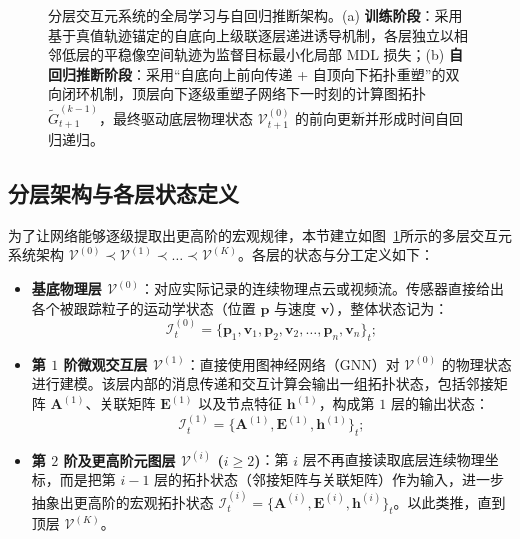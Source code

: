 \documentclass[11pt,a4paper]{article}
\numberwithin{equation}{section}
\theoremstyle{definition}
\theoremstyle{remark}
\begin{document}
\begin{figure}[htbp]
		\caption{分层交互元系统的全局学习与自回归推断架构。(a) \textbf{训练阶段}：采用基于真值轨迹锚定的自底向上级联逐层递进诱导机制，各层独立以相邻低层的平稳像空间轨迹为监督目标最小化局部 MDL 损失；(b) \textbf{自回归推断阶段}：采用“自底向上前向传递 + 自顶向下拓扑重塑”的双向闭环机制，顶层向下逐级重塑子网络下一时刻的计算图拓扑 $\widetilde{G}_{t+1}^{(k-1)}$，最终驱动底层物理状态 $\mathcal{V}_{t+1}^{(0)}$ 的前向更新并形成时间自回归递归。}
		\label{fig:framework-pipeline}
	\end{figure}
	
	\subsection{分层架构与各层状态定义}
	
	为了让网络能够逐级提取出更高阶的宏观规律，本节建立如图~\ref{fig:framework-pipeline}所示的多层交互元系统架构 $\mathcal{V}^{(0)} \prec \mathcal{V}^{(1)} \prec \dots \prec \mathcal{V}^{(K)}$。各层的状态与分工定义如下：
	\begin{itemize}[leftmargin=2em]
		\item \textbf{基底物理层 $\mathcal{V}^{(0)}$}：对应实际记录的连续物理点云或视频流。传感器直接给出各个被跟踪粒子的运动学状态（位置 $\mathbf{p}$ 与速度 $\mathbf{v}$），整体状态记为：
		\begin{equation}
			\mathcal{I}^{(0)}_t = \{\mathbf{p}_1, \mathbf{v}_1, \mathbf{p}_2, \mathbf{v}_2, \dots, \mathbf{p}_n, \mathbf{v}_n\}_t;
		\end{equation}
		\item \textbf{第 $1$ 阶微观交互层 $\mathcal{V}^{(1)}$}：直接使用图神经网络（GNN）对 $\mathcal{V}^{(0)}$ 的物理状态进行建模。该层内部的消息传递和交互计算会输出一组拓扑状态，包括邻接矩阵 $\mathbf{A}^{(1)}$、关联矩阵 $\mathbf{E}^{(1)}$ 以及节点特征 $\mathbf{h}^{(1)}$，构成第 $1$ 层的输出状态：
		\begin{equation}
			\mathcal{I}^{(1)}_t = \{\mathbf{A}^{(1)}, \mathbf{E}^{(1)}, \mathbf{h}^{(1)}\}_t;
		\end{equation}
		\item \textbf{第 $2$ 阶及更高阶元图层 $\mathcal{V}^{(i)}$ ($i \ge 2$)}：第 $i$ 层不再直接读取底层连续物理坐标，而是把第 $i-1$ 层的拓扑状态（邻接矩阵与关联矩阵）作为输入，进一步抽象出更高阶的宏观拓扑状态 $\mathcal{I}^{(i)}_t = \{\mathbf{A}^{(i)}, \mathbf{E}^{(i)}, \mathbf{h}^{(i)}\}_t$。以此类推，直到顶层 $\mathcal{V}^{(K)}$。
	\end{itemize}
\end{document}
